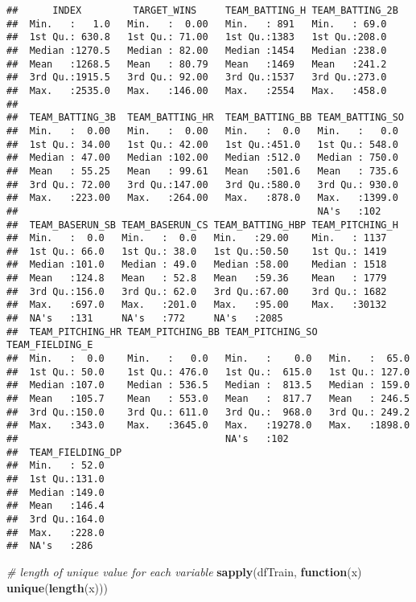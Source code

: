 \documentclass[
]{article}
\newenvironment{Shaded}{\begin{snugshade}}{\end{snugshade}}
\newcommand{\CommentTok}[1]{\textcolor[rgb]{0.56,0.35,0.01}{\textit{#1}}}
\newcommand{\ControlFlowTok}[1]{\textcolor[rgb]{0.13,0.29,0.53}{\textbf{#1}}}
\newcommand{\KeywordTok}[1]{\textcolor[rgb]{0.13,0.29,0.53}{\textbf{#1}}}
\newcommand{\NormalTok}[1]{#1}
\begin{document}
\begin{verbatim}
##      INDEX         TARGET_WINS     TEAM_BATTING_H TEAM_BATTING_2B
##  Min.   :   1.0   Min.   :  0.00   Min.   : 891   Min.   : 69.0  
##  1st Qu.: 630.8   1st Qu.: 71.00   1st Qu.:1383   1st Qu.:208.0  
##  Median :1270.5   Median : 82.00   Median :1454   Median :238.0  
##  Mean   :1268.5   Mean   : 80.79   Mean   :1469   Mean   :241.2  
##  3rd Qu.:1915.5   3rd Qu.: 92.00   3rd Qu.:1537   3rd Qu.:273.0  
##  Max.   :2535.0   Max.   :146.00   Max.   :2554   Max.   :458.0  
##                                                                  
##  TEAM_BATTING_3B  TEAM_BATTING_HR  TEAM_BATTING_BB TEAM_BATTING_SO 
##  Min.   :  0.00   Min.   :  0.00   Min.   :  0.0   Min.   :   0.0  
##  1st Qu.: 34.00   1st Qu.: 42.00   1st Qu.:451.0   1st Qu.: 548.0  
##  Median : 47.00   Median :102.00   Median :512.0   Median : 750.0  
##  Mean   : 55.25   Mean   : 99.61   Mean   :501.6   Mean   : 735.6  
##  3rd Qu.: 72.00   3rd Qu.:147.00   3rd Qu.:580.0   3rd Qu.: 930.0  
##  Max.   :223.00   Max.   :264.00   Max.   :878.0   Max.   :1399.0  
##                                                    NA's   :102     
##  TEAM_BASERUN_SB TEAM_BASERUN_CS TEAM_BATTING_HBP TEAM_PITCHING_H
##  Min.   :  0.0   Min.   :  0.0   Min.   :29.00    Min.   : 1137  
##  1st Qu.: 66.0   1st Qu.: 38.0   1st Qu.:50.50    1st Qu.: 1419  
##  Median :101.0   Median : 49.0   Median :58.00    Median : 1518  
##  Mean   :124.8   Mean   : 52.8   Mean   :59.36    Mean   : 1779  
##  3rd Qu.:156.0   3rd Qu.: 62.0   3rd Qu.:67.00    3rd Qu.: 1682  
##  Max.   :697.0   Max.   :201.0   Max.   :95.00    Max.   :30132  
##  NA's   :131     NA's   :772     NA's   :2085                    
##  TEAM_PITCHING_HR TEAM_PITCHING_BB TEAM_PITCHING_SO  TEAM_FIELDING_E 
##  Min.   :  0.0    Min.   :   0.0   Min.   :    0.0   Min.   :  65.0  
##  1st Qu.: 50.0    1st Qu.: 476.0   1st Qu.:  615.0   1st Qu.: 127.0  
##  Median :107.0    Median : 536.5   Median :  813.5   Median : 159.0  
##  Mean   :105.7    Mean   : 553.0   Mean   :  817.7   Mean   : 246.5  
##  3rd Qu.:150.0    3rd Qu.: 611.0   3rd Qu.:  968.0   3rd Qu.: 249.2  
##  Max.   :343.0    Max.   :3645.0   Max.   :19278.0   Max.   :1898.0  
##                                    NA's   :102                       
##  TEAM_FIELDING_DP
##  Min.   : 52.0   
##  1st Qu.:131.0   
##  Median :149.0   
##  Mean   :146.4   
##  3rd Qu.:164.0   
##  Max.   :228.0   
##  NA's   :286
\end{verbatim}

\begin{Shaded}
\begin{Highlighting}[]
\CommentTok{# length of unique value for each variable}
\KeywordTok{sapply}\NormalTok{(dfTrain, }\ControlFlowTok{function}\NormalTok{(x) }\KeywordTok{unique}\NormalTok{(}\KeywordTok{length}\NormalTok{(x)))}
\end{Highlighting}
\end{Shaded}
\end{document}
